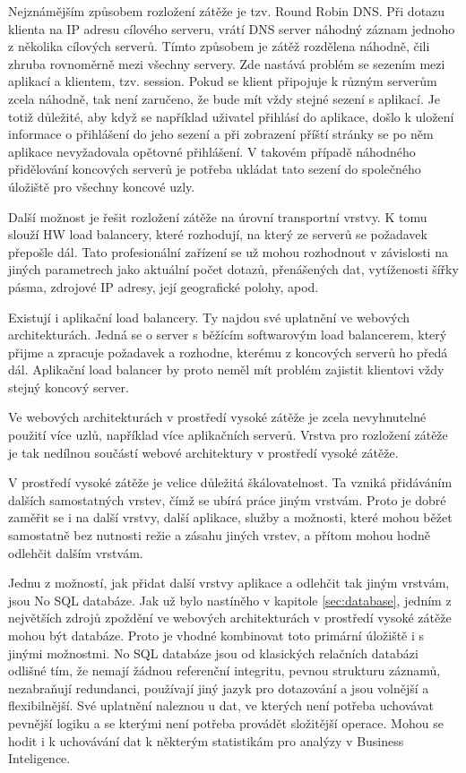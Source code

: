 \documentclass[12pt]{article}
\begin{document}
Nejznámějším způsobem rozložení zátěže je tzv. Round Robin DNS. Při dotazu klienta na IP adresu cílového serveru, vrátí DNS server náhodný záznam jednoho z několika cílových serverů. Tímto způsobem je zátěž rozdělena náhodně, čili zhruba rovnoměrně mezi všechny servery. Zde nastává problém se sezením mezi aplikací a klientem, tzv. session. Pokud se klient připojuje k různým serverům zcela náhodně, tak není zaručeno, že bude mít vždy stejné sezení s aplikací. Je totiž důležité, aby když se například uživatel přihlásí do aplikace, došlo k uložení informace o přihlášení do jeho sezení a při zobrazení příští stránky se po něm aplikace nevyžadovala opětovné přihlášení. V takovém případě náhodného přidělování koncových serverů je potřeba ukládat tato sezení do společného úložiště pro všechny koncové uzly.

Další možnost je řešit rozložení zátěže na úrovní transportní vrstvy. K tomu slouží HW load balancery, které rozhodují, na který ze serverů se požadavek přepošle dál. Tato profesionální zařízení se už mohou rozhodnout v závislosti na jiných parametrech jako aktuální počet dotazů, přenášených dat, vytíženosti šířky pásma, zdrojové IP adresy, její geografické polohy, apod. 

Existují i aplikační load balancery. Ty najdou své uplatnění ve webových architekturách. Jedná se o server s běžícím softwarovým load balancerem, který přijme a zpracuje požadavek a rozhodne, kterému z koncových serverů ho předá dál. Aplikační load balancer by proto neměl mít problém zajistit klientovi vždy stejný koncový server.

Ve webových architekturách v prostředí vysoké zátěže je zcela nevyhnutelné použití více uzlů, například více aplikačních serverů. Vrstva pro rozložení zátěže je tak nedílnou součástí webové architektury v prostředí vysoké zátěže.

\obrazek
{}


V prostředí vysoké zátěže je velice důležitá škálovatelnost. Ta vzniká přidáváním dalších samostatných vrstev, čímž se ubírá práce jiným vrstvám. Proto je dobré zaměřit se i na další vrstvy, další aplikace, služby a možnosti, které mohou běžet samostatně bez nutnosti režie a zásahu jiných vrstev, a přítom mohou hodně odlehčit dalším vrstvám.

Jednu z možností, jak přidat další vrstvy aplikace a odlehčit tak jiným vrstvám, jsou No SQL databáze. Jak už bylo nastíněho v kapitole \ref{sec:database}, jedním z největších zdrojů zpoždění ve webových architekturách v prostředí vysoké zátěže mohou být databáze. Proto je vhodné kombinovat toto primární úložiště i s jinými možnostmi. No SQL databáze jsou od klasických relačních databázi odlišné tím, že nemají žádnou referenční integritu, pevnou strukturu záznamů, nezabraňují redundanci, používají jiný jazyk pro dotazování a jsou volnější a flexibilnější. Své uplatnění naleznou u dat, ve kterých není potřeba uchovávat pevnější logiku a se kterými není potřeba provádět složitější operace. Mohou se hodit i k uchovávání dat k některým statistikám pro analýzy v Business Inteligence.
\end{document}
